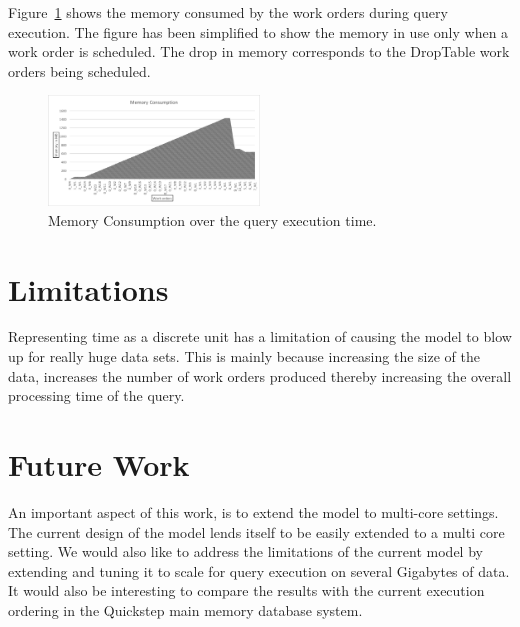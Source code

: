 \documentclass[20pt]{sigchi}
\begin{document}
Figure~\ref{fig4:memory-consumption} shows the memory consumed by the work orders during query execution. The figure has been simplified to show the memory in use only when a work order is scheduled. The drop in memory corresponds to the DropTable work orders being scheduled.

\begin{figure}
  \centering
    \includegraphics[width=0.5\textwidth]{figures/memory_utilization}
      \caption{Memory Consumption over the query execution time.}
      \label{fig4:memory-consumption}
\end{figure}
\section{Limitations}
Representing time as a discrete unit has a limitation of causing the model to blow up for really huge data sets. This is mainly because increasing the size of the data, increases the number of work orders produced thereby increasing the overall processing time of the query. 
\section{Future Work}
An important aspect of this work, is to extend the model to multi-core settings. The current design of the model lends itself to be easily extended to a multi core setting.   We would also like to address the limitations of the current model by extending and tuning it to scale for query execution on several Gigabytes of data. It would also be interesting to compare the results with the current execution ordering in the Quickstep main memory database system.


\end{document}
